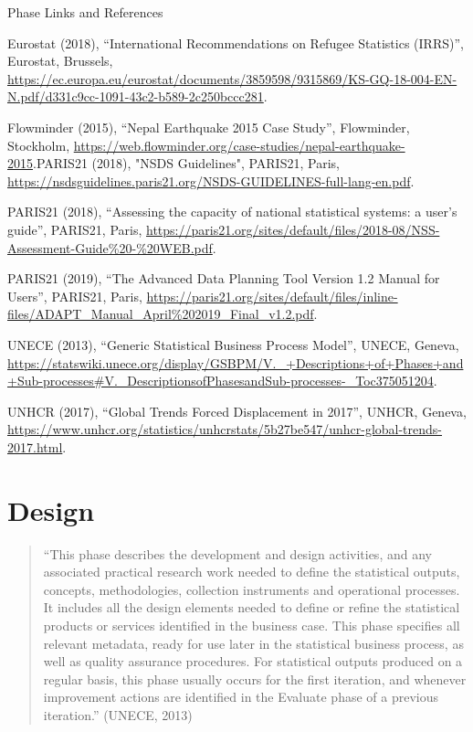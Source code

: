 \documentclass[
]{article}
\begin{document}
Phase Links and References

Eurostat (2018), ``International Recommendations on Refugee Statistics
(IRRS)'', Eurostat, Brussels,
\url{https://ec.europa.eu/eurostat/documents/3859598/9315869/KS-GQ-18-004-EN-N.pdf/d331c9cc-1091-43c2-b589-2c250bccc281}.

Flowminder (2015), ``Nepal Earthquake 2015 Case Study'', Flowminder,
Stockholm,
\url{https://web.flowminder.org/case-studies/nepal-earthquake-2015}.PARIS21
(2018), "NSDS Guidelines", PARIS21, Paris,
\url{https://nsdsguidelines.paris21.org/NSDS-GUIDELINES-full-lang-en.pdf}.

PARIS21 (2018), ``Assessing the capacity of national statistical systems:
a user's guide'', PARIS21, Paris,
\url{https://paris21.org/sites/default/files/2018-08/NSS-Assessment-Guide\%20-\%20WEB.pdf}.

PARIS21 (2019), ``The Advanced Data Planning Tool Version 1.2 Manual for
Users'', PARIS21, Paris,
\url{https://paris21.org/sites/default/files/inline-files/ADAPT_Manual_April\%202019_Final_v1.2.pdf}.

UNECE (2013), ``Generic Statistical Business Process Model'', UNECE,
Geneva,
\url{https://statswiki.unece.org/display/GSBPM/V._+Descriptions+of+Phases+and+Sub-processes\#V._DescriptionsofPhasesandSub-processes-_Toc375051204}.

UNHCR (2017), ``Global Trends Forced Displacement in 2017'', UNHCR,
Geneva,
\url{https://www.unhcr.org/statistics/unhcrstats/5b27be547/unhcr-global-trends-2017.html}.

\hypertarget{design}{%
\section{Design}\label{design}}

\begin{quote}
``This phase describes the development and design activities, and any
associated practical research work needed to define the statistical
outputs, concepts, methodologies, collection instruments and
operational processes. It includes all the design elements needed to
define or refine the statistical products or services identified in
the business case. This phase specifies all relevant metadata, ready
for use later in the statistical business process, as well as quality
assurance procedures. For statistical outputs produced on a regular
basis, this phase usually occurs for the first iteration, and whenever
improvement actions are identified in the Evaluate phase of a previous
iteration.'' (UNECE, 2013)
\end{quote}
\end{document}
